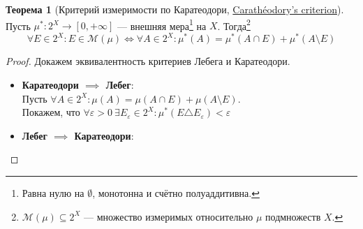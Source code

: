 \documentclass[11pt,a4paper]{report}
\def\eps{\varepsilon}
\theoremstyle{definition}
\theoremstyle{definition}
\newtheorem{theorem}{Теорема}[section]
\theoremstyle{definition}
\begin{document}
	\begin{theorem}[Критерий измеримости по Каратеодори, \href{https://goo.gl/RH4wbo}{Carathéodory's criterion}]$  $\\
		Пусть $ \mu^{*}: 2^{X} \to [0, +\infty] $ — внешняя мера\footnote{Равна нулю на $ \emptyset $, монотонна и счётно полуаддитивна.} на $ X $. Тогда\footnote{$ \mathcal{M}(\mu) \subseteq 2^{X} $ — множество измеримых относительно $ \mu $ подмножеств $ X $.}
		\[ \forall E \in 2^{X}: E \in \mathcal{M}(\mu) \iff \forall A \in 2^{X}: \mu^{*}(A) = \mu^{*}(A \cap E) + \mu^{*}(A \setminus E) \]
	\end{theorem}
	\begin{proof}
		Докажем эквивалентность критериев Лебега и Каратеодори.
		\begin{itemize}
			\item \textbf{Каратеодори $ \implies  $ Лебег}:\\
				Пусть $ \forall A \in 2^{X}: \mu(A) = \mu(A \cap E) + \mu(A \setminus E) $.\\
				Покажем, что $ \forall \eps > 0\ \exists E_{\eps} \in 2^{X}: \mu^{*}(E \triangle E_{\eps}) < \eps $
			\item \textbf{Лебег $ \implies  $ Каратеодори}:
		\end{itemize}
	\end{proof}
\end{document}
